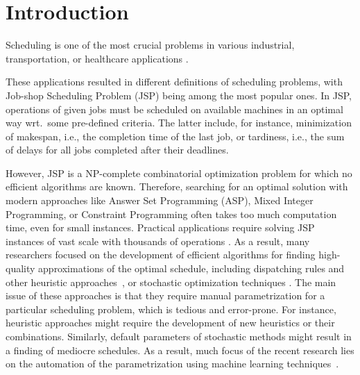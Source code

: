 \documentclass[runningheads]{llncs}
\begin{document}
\section{Introduction}
Scheduling is one of the most crucial problems in various industrial, transportation, or healthcare applications
 \cite{pezzella2008genetic,chaudhry2016research,nouiri2018effective,demirbilek2019dynamically,schoenfelder2020nurse,wang2019routing,janakbhai2021blockchain}. 

These applications resulted in different definitions of scheduling problems, with Job-shop Scheduling Problem (JSP) being among the most popular ones.
In JSP, operations of given jobs must be scheduled on available machines in an optimal way wrt.\ some pre-defined criteria. The latter include, for instance, minimization of makespan, i.e., the completion time of the last job, or tardiness, i.e., the sum of delays for all jobs completed after their deadlines. 

However, JSP is a NP-complete combinatorial optimization problem \cite{DBLP:journals/mor/GareyJS76,SOTSKOV1995237} for which no efficient algorithms are known. Therefore, searching for an optimal solution with modern approaches like Answer Set Programming (ASP), Mixed Integer Programming, or Constraint Programming \cite{meng2020mixed,el2020job,al2017job}
often takes too much computation time, even for small instances. Practical applications require solving JSP instances of vast scale with thousands of operations \cite{zhang2010hybrid}.
As a result, many researchers focused on the development of efficient algorithms for finding high-quality approximations of the optimal schedule, including dispatching rules and other heuristic approaches~\cite{blackstone1982state}, or stochastic optimization techniques \cite{DBLP:journals/informs/VaessensAL96,DBLP:journals/jim/CalisB15}.  
The main issue of these approaches is that they require manual parametrization for a particular scheduling problem, which is tedious and error-prone. For instance, heuristic approaches might require the development of new heuristics or their combinations. Similarly, default parameters of stochastic methods might result in a finding of mediocre schedules.    
As a result, much focus of the recent research lies on the automation of the parametrization using machine learning techniques~\cite{bengio2020machine}.


\end{document}
